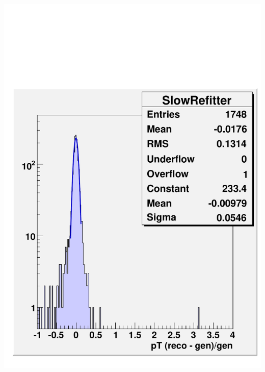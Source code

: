 \documentclass[compress]{beamer}
\begin{document}
\begin{frame}
\begin{columns}
\includegraphics[width=\linewidth]{ptresolution_slow.pdf}
\end{columns}

\end{frame}
\end{document}
